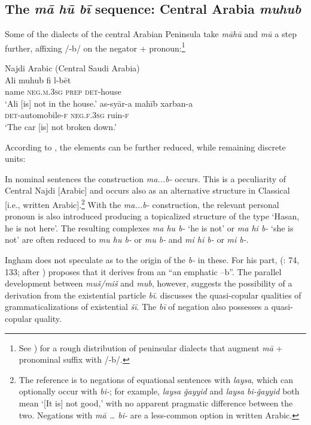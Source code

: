 \documentclass[output=paper]{langsci/langscibook}
\begin{document}
\subsection{The \textit{mā hū bī} sequence: Central Arabia \textit{muhub}} \label{s:WiAR-4.4}

Some of the dialects of the central Arabian Peninsula take \textit{māhū} and \textit{mū} a step further, affixing /-b/ on the negator + pronoun:\footnote{See \citet[127]{prochazka2010a}) for a rough distribution of peninsular dialects that augment \textit{mā}  + pronominal suffix with /-b/.}

\ea Najdi Arabic (Central Saudi Arabia)\label{ex:WiAR-33}\\
  \ea
  	\gll Ali muhub fi l-bēt\\
  	name \textsc{neg.m.3sg} \textsc{prep} \textsc{det}-house\\
  	\glt ‘Ali [is] not in the house.’ \citep[75]{binturki2015a}
  \ex
  	\gll as-syār-a mahīb xarban-a\\
  	\textsc{det}-automobile-\textsc{f} \textsc{neg.f.3sg} ruin-\textsc{f}\\
  	\glt ‘The car [is] not broken down.’ \citep[76]{binturki2015a}
\z \z


According to \citet{ingham1994a}, the elements can be further reduced, while remaining discrete units:

\begin{displayquote}
    In nominal sentences the construction \textit{ma...b-} occurs. This is a peculiarity of Central Najdi [Arabic] and occurs also as an alternative structure in Classical [i.e., written Arabic].\footnote{The reference is to negations of equational sentences with \textit{laysa}, which can optionally occur with \textit{bi-}; for example, \textit{laysa ǧayyid} and \textit{laysa bi-ǧayyid} both mean ‘[It is] not good,’ with no apparent pragmatic difference between the two. Negations with \textit{mā … bi-} are a less-common option in written Arabic.} With the \textit{ma...b-} construction, the relevant personal pronoun is also introduced producing a topicalized structure of the type ‘Hasan, he is not here’. The resulting complexes \textit{ma hu b-} ‘he is not’ or \textit{ma hi b-} ‘she is not’ are often reduced to \textit{mu hu b-} or \textit{mu b-} and \textit{mi hi b-} or \textit{mi b-}. \citep{ingham1994a}
\end{displayquote}

Ingham does not speculate as to the origin of the \textit{b-} in these. For his part, \citeauthor{binturki2015a} (\citeyear{binturki2015a}: 74, 133; after \citealp{matar1976a}) proposes that it derives from an “an emphatic –b”. The parallel development between \textit{muš/miš} and \textit{mub}, however, suggests the possibility of a derivation from the existential particle \textit{bī}. \citet[288-289]{wilmsen2017a} discusses the quasi-copular qualities of grammaticalizations of existential \textit{šī}. The \textit{bī} of negation also possesses a quasi-copular quality.
\end{document}
